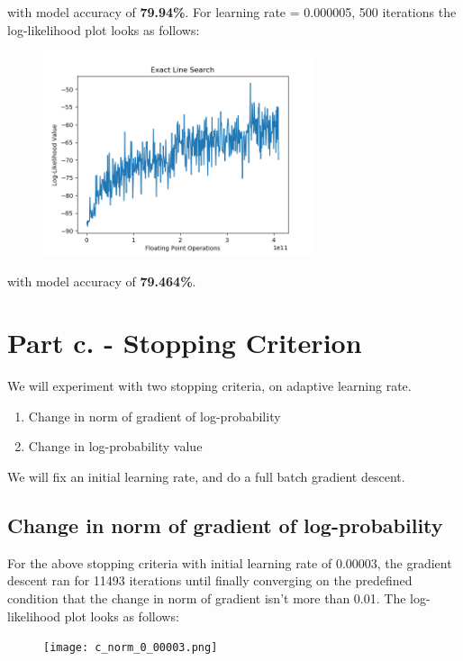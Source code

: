 \documentclass[a4paper]{article}
\begin{document}
\noindent with model accuracy of \textbf{79.94\%}.
\vskip 0.1in
\noindent For learning rate = 0.000005, 500 iterations the log-likelihood plot looks as follows:


\begin{figure}[h!]
\centering
\includegraphics[width=8cm,height=6cm]{b_els_000005_500_79464.png}
\end{figure}

\noindent with model accuracy of \textbf{79.464\%}.

\section*{Part c. - Stopping Criterion}
\label{sec:partc}

We will experiment with two stopping criteria, on adaptive learning rate.

\begin{enumerate}
	\item Change in norm of gradient of log-probability
    \item Change in log-probability value
\end{enumerate}

\vskip 0.15in
\noindent We will fix an initial learning rate, and do a full batch gradient descent.

\subsection*{Change in norm of gradient of log-probability}
For the above stopping criteria with initial learning rate of 0.00003, the gradient descent ran for 11493 iterations until finally converging on the predefined condition that the change in norm of gradient isn't more than 0.01. The log-likelihood plot looks as follows:
\begin{figure}[h!]
\centering
\texttt{[image: c\_norm\_0\_00003.png]}
\end{figure}
\end{document}
